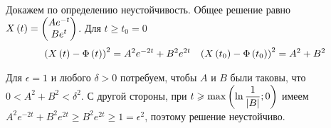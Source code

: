 \documentclass[a5paper,10pt]{article}
\begin{document}
Докажем по определению неустойчивость. Общее решение равно $X\left(t\right) = \begin{pmatrix} A e^{-t} \\ B e^{t} \end{pmatrix}$. Для $t \ge t_{0} = 0$
\begin{align*}
\left(X\left(t\right) - \Phi\left(t\right)\right)^2 = A^2 e^{-2t} + B^2 e^{2t} &&
\left(X\left(t_{0}\right) - \Phi\left(t_{0}\right)\right)^2 = A^2 + B^2
\end{align*}

Для $\epsilon = 1$ и любого $\delta > 0$ потребуем, чтобы $A$ и $B$ были таковы, что $0 < A^2 + B^2 < \delta^2$. С другой стороны, при
$t \geqslant \max\left(\ln \dfrac {1} {\left|B\right|}; 0\right)$ имеем 
$A^2 e^{-2t} + B^2 e^{2t} \ge B^2 e^{2t} \ge 1 = \epsilon^2$, поэтому решение неустойчиво.
\end{document}
